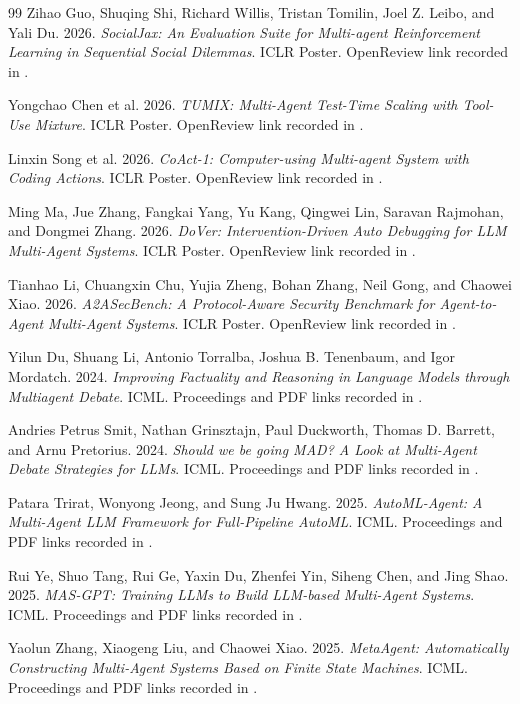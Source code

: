 \documentclass[11pt]{article}
\begin{document}
\begin{thebibliography}{99}
Zihao Guo, Shuqing Shi, Richard Willis, Tristan Tomilin, Joel Z. Leibo, and Yali Du. 2026. \emph{SocialJax: An Evaluation Suite for Multi-agent Reinforcement Learning in Sequential Social Dilemmas}. ICLR Poster. OpenReview link recorded in \cite{iclr_subset}.

Yongchao Chen et al. 2026. \emph{TUMIX: Multi-Agent Test-Time Scaling with Tool-Use Mixture}. ICLR Poster. OpenReview link recorded in \cite{iclr_subset}.

Linxin Song et al. 2026. \emph{CoAct-1: Computer-using Multi-agent System with Coding Actions}. ICLR Poster. OpenReview link recorded in \cite{iclr_subset}.

Ming Ma, Jue Zhang, Fangkai Yang, Yu Kang, Qingwei Lin, Saravan Rajmohan, and Dongmei Zhang. 2026. \emph{DoVer: Intervention-Driven Auto Debugging for LLM Multi-Agent Systems}. ICLR Poster. OpenReview link recorded in \cite{iclr_subset}.

Tianhao Li, Chuangxin Chu, Yujia Zheng, Bohan Zhang, Neil Gong, and Chaowei Xiao. 2026. \emph{A2ASecBench: A Protocol-Aware Security Benchmark for Agent-to-Agent Multi-Agent Systems}. ICLR Poster. OpenReview link recorded in \cite{iclr_subset}.

Yilun Du, Shuang Li, Antonio Torralba, Joshua B. Tenenbaum, and Igor Mordatch. 2024. \emph{Improving Factuality and Reasoning in Language Models through Multiagent Debate}. ICML. Proceedings and PDF links recorded in \cite{icml_list}.

Andries Petrus Smit, Nathan Grinsztajn, Paul Duckworth, Thomas D. Barrett, and Arnu Pretorius. 2024. \emph{Should we be going MAD? A Look at Multi-Agent Debate Strategies for LLMs}. ICML. Proceedings and PDF links recorded in \cite{icml_list}.

Patara Trirat, Wonyong Jeong, and Sung Ju Hwang. 2025. \emph{AutoML-Agent: A Multi-Agent LLM Framework for Full-Pipeline AutoML}. ICML. Proceedings and PDF links recorded in \cite{icml_list}.

Rui Ye, Shuo Tang, Rui Ge, Yaxin Du, Zhenfei Yin, Siheng Chen, and Jing Shao. 2025. \emph{MAS-GPT: Training LLMs to Build LLM-based Multi-Agent Systems}. ICML. Proceedings and PDF links recorded in \cite{icml_list}.

Yaolun Zhang, Xiaogeng Liu, and Chaowei Xiao. 2025. \emph{MetaAgent: Automatically Constructing Multi-Agent Systems Based on Finite State Machines}. ICML. Proceedings and PDF links recorded in \cite{icml_list}.


\end{thebibliography}
\end{document}
